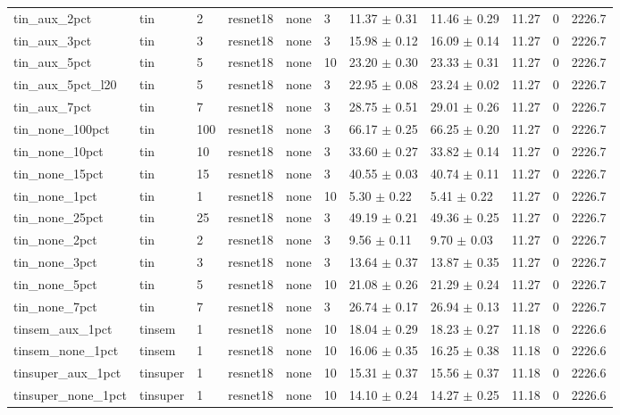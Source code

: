 \begin{tabular}{lllllllllll}
tin_aux_2pct & tin & 2 & resnet18 & none & 3 & 11.37 $\pm$ 0.31 & 11.46 $\pm$ 0.29 & 11.27 & 0 & 2226.7 \\
tin_aux_3pct & tin & 3 & resnet18 & none & 3 & 15.98 $\pm$ 0.12 & 16.09 $\pm$ 0.14 & 11.27 & 0 & 2226.7 \\
tin_aux_5pct & tin & 5 & resnet18 & none & 10 & 23.20 $\pm$ 0.30 & 23.33 $\pm$ 0.31 & 11.27 & 0 & 2226.7 \\
tin_aux_5pct_l20 & tin & 5 & resnet18 & none & 3 & 22.95 $\pm$ 0.08 & 23.24 $\pm$ 0.02 & 11.27 & 0 & 2226.7 \\
tin_aux_7pct & tin & 7 & resnet18 & none & 3 & 28.75 $\pm$ 0.51 & 29.01 $\pm$ 0.26 & 11.27 & 0 & 2226.7 \\
tin_none_100pct & tin & 100 & resnet18 & none & 3 & 66.17 $\pm$ 0.25 & 66.25 $\pm$ 0.20 & 11.27 & 0 & 2226.7 \\
tin_none_10pct & tin & 10 & resnet18 & none & 3 & 33.60 $\pm$ 0.27 & 33.82 $\pm$ 0.14 & 11.27 & 0 & 2226.7 \\
tin_none_15pct & tin & 15 & resnet18 & none & 3 & 40.55 $\pm$ 0.03 & 40.74 $\pm$ 0.11 & 11.27 & 0 & 2226.7 \\
tin_none_1pct & tin & 1 & resnet18 & none & 10 & 5.30 $\pm$ 0.22 & 5.41 $\pm$ 0.22 & 11.27 & 0 & 2226.7 \\
tin_none_25pct & tin & 25 & resnet18 & none & 3 & 49.19 $\pm$ 0.21 & 49.36 $\pm$ 0.25 & 11.27 & 0 & 2226.7 \\
tin_none_2pct & tin & 2 & resnet18 & none & 3 & 9.56 $\pm$ 0.11 & 9.70 $\pm$ 0.03 & 11.27 & 0 & 2226.7 \\
tin_none_3pct & tin & 3 & resnet18 & none & 3 & 13.64 $\pm$ 0.37 & 13.87 $\pm$ 0.35 & 11.27 & 0 & 2226.7 \\
tin_none_5pct & tin & 5 & resnet18 & none & 10 & 21.08 $\pm$ 0.26 & 21.29 $\pm$ 0.24 & 11.27 & 0 & 2226.7 \\
tin_none_7pct & tin & 7 & resnet18 & none & 3 & 26.74 $\pm$ 0.17 & 26.94 $\pm$ 0.13 & 11.27 & 0 & 2226.7 \\
tinsem_aux_1pct & tinsem & 1 & resnet18 & none & 10 & 18.04 $\pm$ 0.29 & 18.23 $\pm$ 0.27 & 11.18 & 0 & 2226.6 \\
tinsem_none_1pct & tinsem & 1 & resnet18 & none & 10 & 16.06 $\pm$ 0.35 & 16.25 $\pm$ 0.38 & 11.18 & 0 & 2226.6 \\
tinsuper_aux_1pct & tinsuper & 1 & resnet18 & none & 10 & 15.31 $\pm$ 0.37 & 15.56 $\pm$ 0.37 & 11.18 & 0 & 2226.6 \\
tinsuper_none_1pct & tinsuper & 1 & resnet18 & none & 10 & 14.10 $\pm$ 0.24 & 14.27 $\pm$ 0.25 & 11.18 & 0 & 2226.6 \\

\end{tabular}
